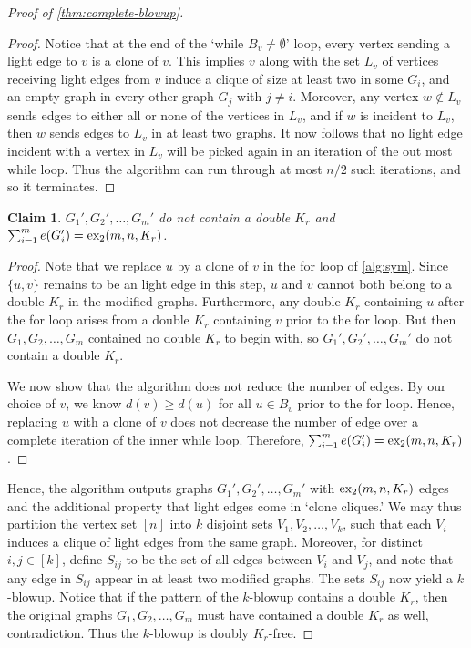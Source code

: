 \documentclass[10pt, reqno]{report}
\newtheorem{claim}{Claim}[theorem]
\newcommand*{\dex}{\textnormal{ex}_2}
\begin{document}
\begin{proof}[Proof of \cref{thm:complete-blowup}]
  \begin{proof}
    Notice that at the end of the `while $B_v \neq \emptyset$' loop, every vertex sending a light edge to $v$ is a clone of $v$. This implies $v$ along with the set $L_v$ of vertices receiving light edges from $v$ induce a clique of size at least two in some $G_i$, and an empty graph in every other graph $G_j$ with $j \neq i$. Moreover, any vertex $w \notin L_v$ sends edges to either all or none of the vertices in $L_v$, and if $w$ is incident to $L_v$, then $w$ sends edges to $L_v$ in at least two graphs. It now follows that no light edge incident with a vertex in $L_v$ will be picked again in an iteration of the out most while loop. Thus the algorithm can run through at most $n/2$ such iterations, and so it terminates.
  \end{proof}

  \begin{claim}
    $G_1', G_2', \ldots, G_m'$ do not contain a double $K_r$ and $\sum_{i = 1}^m e(G_i') = \dex(m, n, K_r)$. 
  \end{claim}

  \begin{proof}
    Note that we replace $u$ by a clone of $v$ in the for loop of \cref{alg:sym}. Since $\{u, v\}$ remains to be an light edge in this step, $u$ and $v$ cannot both belong to a double $K_r$ in the modified graphs. Furthermore, any double $K_r$ containing $u$ after the for loop arises from a double $K_r$ containing $v$ prior to the for loop. But then $G_1, G_2, \ldots, G_m$ contained no double $K_r$ to begin with, so $G_1', G_2', \ldots, G_m'$ do not contain a double $K_r$.

    We now show that the algorithm does not reduce the number of edges. By our choice of $v$, we know $d(v) \geq d(u)$ for all $u \in B_v$ prior to the for loop. Hence, replacing $u$ with a clone of $v$ does not decrease the number of edge over a complete iteration of the inner while loop. Therefore, $\sum_{i = 1}^m e(G_i') = \dex(m, n, K_r)$. 
  \end{proof}

  Hence, the algorithm outputs graphs $G_1', G_2', \ldots, G_m'$ with $\dex(m, n, K_r)$ edges and the additional property that light edges come in `clone cliques.' We may thus partition the vertex set $[n]$ into $k$ disjoint sets $V_1, V_2, \ldots, V_k$, such that each $V_i$ induces a clique of light edges from the same graph. Moreover, for distinct $i, j \in [k]$, define $S_{ij}$ to be the set of all edges between $V_i$ and $V_j$, and note that any edge in $S_{ij}$ appear in at least two modified graphs. The sets $S_{ij}$ now yield a $k$-blowup. Notice that if the pattern of the $k$-blowup contains a double $K_r$, then the original graphs $G_1, G_2, \ldots, G_m$ must have contained a double $K_r$ as well, contradiction. Thus the $k$-blowup is doubly $K_r$-free. 


\end{proof}
\end{document}

